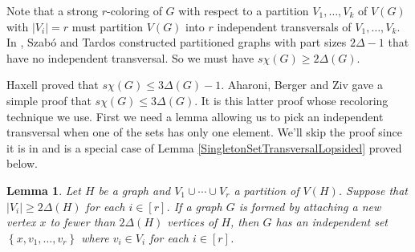 \documentclass[12pt]{article}
\theoremstyle{plain}
\newtheorem{lem}[thm]{Lemma}
\theoremstyle{definition}
\theoremstyle{remark}
\newcommand{\set}[1]{\left\{ #1 \right\}}
\newcommand{\card}[1]{\left|#1\right|}
\newcommand{\irange}[1]{\left[#1\right]}
\begin{document}
Note that a strong $r$-coloring of $G$ with respect to a partition $V_1, \ldots, V_k$ of $V(G)$ with $\card{V_i} = r$ must partition $V(G)$ into $r$ independent transversals of $V_1, \ldots, V_k$. In \cite{szabo2006extremal}, Szab{\'o} and Tardos constructed partitioned graphs with part sizes $2\Delta - 1$ that have no independent transversal.  So we must have $s\chi(G) \geq 2\Delta(G)$.  

Haxell \cite{haxell2004strong} proved that $s\chi(G) \leq 3\Delta(G) - 1$.  Aharoni, Berger and Ziv \cite{aharoni2007independent} gave a simple proof that $s\chi(G) \leq 3\Delta(G)$.  It is this latter proof whose recoloring technique we use.  First we need a lemma allowing us to pick an independent transversal when one of the sets has only one element.  We'll skip the proof since it is in \cite{aharoni2007independent} and is a special case of Lemma \ref{SingletonSetTransversalLopsided} proved below.

\begin{lem}\label{SingletonSetTransversal}
Let $H$ be a graph and $V_1 \cup \cdots \cup V_r$ a partition of $V(H)$. 
Suppose that $\card{V_i} \geq 2\Delta(H)$ for each $i \in \irange{r}$.  If a
graph $G$ is formed by attaching a new vertex $x$ to fewer than $2\Delta(H)$
vertices of $H$,  then $G$ has an independent set $\set{x, v_1, \ldots, v_r}$
where $v_i \in V_i$ for each $i \in \irange{r}$.
\end{lem}
\end{document}
